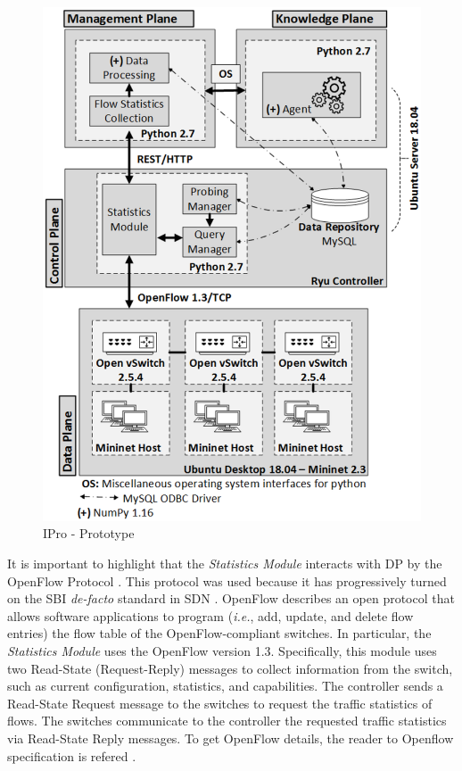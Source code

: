 \begin{figure}[H]
    \centering
    \includegraphics[scale=0.5]{figures/Fig5-IPro-prototype}
    \caption{IPro - Prototype}
    \label{fig:prototype_ipro}
\end{figure}

It is important to highlight that the \textit{Statistics Module} interacts with DP by the OpenFlow Protocol \cite{onf_2012:openflow}. This protocol was used because it has progressively turned on the SBI \textit{de-facto} standard in SDN \cite{nunes_2014:survey_past_present_future}. OpenFlow describes an open protocol that allows software applications to program (\textit{i.e.}, add, update, and delete flow entries) the flow table of the OpenFlow-compliant switches. In particular, the \textit{Statistics Module} uses the OpenFlow version 1.3. Specifically, this module uses two Read-State (Request-Reply) messages to collect information from the switch, such as current configuration, statistics, and capabilities. The controller sends a Read-State Request message to the switches to request the traffic statistics of flows. The switches communicate to the controller the requested traffic statistics via Read-State Reply messages. To get OpenFlow details,  the reader to Openflow specification is refered \cite{onf_2012:openflow}.

